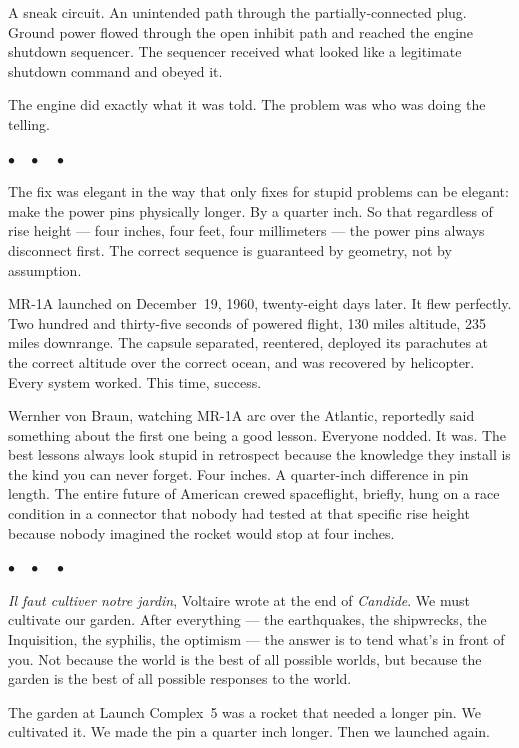 \documentclass[12pt, letterpaper]{article}
\begin{document}
A sneak circuit. An unintended path through the partially-connected plug. Ground power flowed through the open inhibit path and reached the engine shutdown sequencer. The sequencer received what looked like a legitimate shutdown command and obeyed it.

The engine did exactly what it was told. The problem was who was doing the telling.

\begin{center}
$\bullet\quad\bullet\quad\bullet$
\end{center}

The fix was elegant in the way that only fixes for stupid problems can be elegant: make the power pins physically longer. By a quarter inch. So that regardless of rise height --- four inches, four feet, four millimeters --- the power pins always disconnect first. The correct sequence is guaranteed by geometry, not by assumption.

MR-1A launched on December~19, 1960, twenty-eight days later. It flew perfectly. Two hundred and thirty-five seconds of powered flight, 130 miles altitude, 235 miles downrange. The capsule separated, reentered, deployed its parachutes at the correct altitude over the correct ocean, and was recovered by helicopter. Every system worked. This time, success.

Wernher von Braun, watching MR-1A arc over the Atlantic, reportedly said something about the first one being a good lesson. Everyone nodded. It was. The best lessons always look stupid in retrospect because the knowledge they install is the kind you can never forget. Four inches. A quarter-inch difference in pin length. The entire future of American crewed spaceflight, briefly, hung on a race condition in a connector that nobody had tested at that specific rise height because nobody imagined the rocket would stop at four inches.

\begin{center}
$\bullet\quad\bullet\quad\bullet$
\end{center}

\textit{Il faut cultiver notre jardin}, Voltaire wrote at the end of \textit{Candide}. We must cultivate our garden. After everything --- the earthquakes, the shipwrecks, the Inquisition, the syphilis, the optimism --- the answer is to tend what's in front of you. Not because the world is the best of all possible worlds, but because the garden is the best of all possible responses to the world.

The garden at Launch Complex~5 was a rocket that needed a longer pin. We cultivated it. We made the pin a quarter inch longer. Then we launched again.
\end{document}
